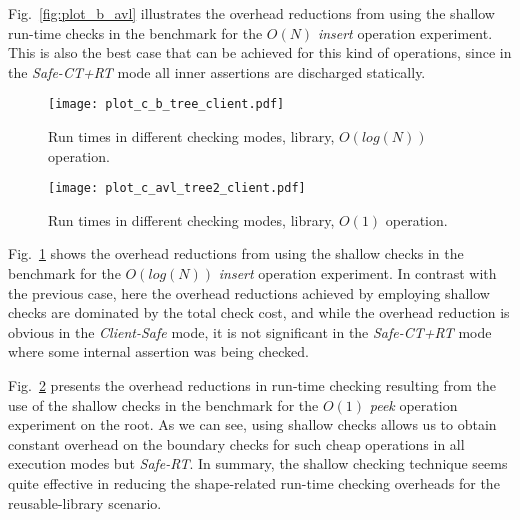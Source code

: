 \documentclass{llncs}
\newcommand{\finalcompression}[1]{\vspace*{#1}}
\begin{document}
Fig.~\ref{fig:plot_b_avl} illustrates the overhead reductions from using the
shallow
run-time checks in the  benchmark for
the $O(N)$ \emph{insert} operation experiment.
%
This is also the best case that can be achieved for this kind of
operations, since in the \emph{Safe-CT+RT} mode all inner assertions are
discharged statically.
%
\begin{figure}[t]
  \centering
  \texttt{[image: plot\_c\_b\_tree\_client.pdf]}
    \finalcompression{-3mm}
  \caption{Run times in different checking modes,
           library, $O(log(N))$ operation.}
  \label{fig:plot_b_b}

\end{figure}
%
\begin{figure}[t]
  \centering
  \texttt{[image: plot\_c\_avl\_tree2\_client.pdf]}
    \finalcompression{-3mm}
  \caption{Run times in different checking modes, 
    library, $O(1)$ operation.}
  \label{fig:plot_b_avl2}

\end{figure}
%
%
Fig.~\ref{fig:plot_b_b} shows the overhead reductions from using the
shallow
checks in the  benchmark for
the $O(log(N))$ \emph{insert} operation experiment.
%
In contrast with the previous case, here the overhead reductions
achieved by employing shallow checks are dominated by the total check
cost,
%
and while the overhead reduction is obvious in the \emph{Client-Safe}
mode, it is not significant in the \emph{Safe-CT+RT} mode where some
internal assertion was being checked.
%

Fig.~\ref{fig:plot_b_avl2} presents the overhead reductions in
run-time checking resulting from the use of the shallow
checks in the  benchmark for the $O(1)$ \emph{peek}
operation experiment on the root.
%
As we can see, using shallow checks allows us to obtain constant
overhead on the boundary checks for such cheap operations in all
execution modes but \emph{Safe-RT}.
%
In summary, the shallow checking technique seems quite effective in
reducing the shape-related run-time checking overheads for the
reusable-library scenario.
\end{document}

